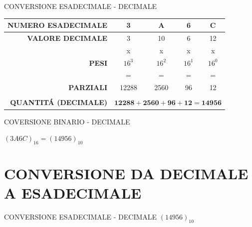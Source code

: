 \documentclass[aspectratio=1610]{beamer}
\begin{document}
\begin{frame}{CONVERSIONE ESADECIMALE - DECIMALE}
\centering
    \begin{tabular}{r||c|c|c|c}
        \textbf{NUMERO ESADECIMALE} & 3 & \textbf{A} & 6 & \textbf{C} \\
        \hline
        \pause
        \textbf{VALORE DECIMALE} & 3 & 10 & 6 & 12 \\
        \hline
        \pause
         & x & x & x & x \\
        \hline
         \textbf{PESI} & $16^3$ & $16^2$ & $16^1$ & $16^0$ \\
        \hline
         & = & = & = & = \\
        \hline
        \pause
        \textbf{PARZIALI} & 12288 & 2560 & 96 & 12 \\
        \\
        \hline
        \pause
        \textbf{QUANTIT\'A (DECIMALE)} & \multicolumn{4}{c}{$\mathbf{12288 + 2560 + 96 + 12 = 14956}$} \\
    \end{tabular}
    \pause
    \begin{alertblock}{COVERSIONE BINARIO - DECIMALE}
        \begin{minipage}{0.98\linewidth}
            \centering
            \huge
            $(3A6C)_{16} = (14956)_{10}$
        \end{minipage}
    \end{alertblock}
\end{frame}

\section{CONVERSIONE DA DECIMALE A ESADECIMALE}

\begin{frame}{CONVERSIONE ESADECIMALE - DECIMALE}
    \centering
    \huge
    $(14956)_{10}$
\end{frame}
\end{document}
